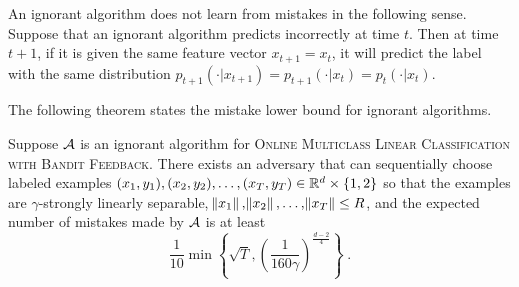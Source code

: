 An ignorant algorithm does not learn from mistakes in the following sense.
Suppose that an ignorant algorithm predicts incorrectly at time $t$. Then at
time $t+1$, if it is given the same feature vector $x_{t+1}=x_t$, it will
predict the label with the same distribution
$p_{t+1}(\cdot|x_{t+1})=p_{t+1}(\cdot|x_t)=p_t(\cdot|x_t)$.


The following theorem states the mistake lower bound for ignorant algorithms.

\begin{theorem}
\label{theorem:ignorant-lower-bound}
Suppose $\mathcal{A}$ is an ignorant algorithm for \textsc{Online Multiclass Linear
Classification with Bandit Feedback}. There exists an adversary that can
sequentially choose labeled examples $(x_1, y_1), (x_2, y_2), \dots, (x_T, y_T)
\in \mathbb{R}^d\times \{1,2\}$ so that the examples are $\gamma$-strongly linearly
separable, $\norm{x_1}, \norm{x_2}, \dots, \norm{x_T} \le R$, and the expected
number of mistakes made by $\mathcal{A}$ is at least
$$
\frac{1}{10}\min\left\{\sqrt{T}, \left(\frac{1}{160\gamma}\right)^{\frac{d-2}{4}} \right\} \; .
$$
\end{theorem}

